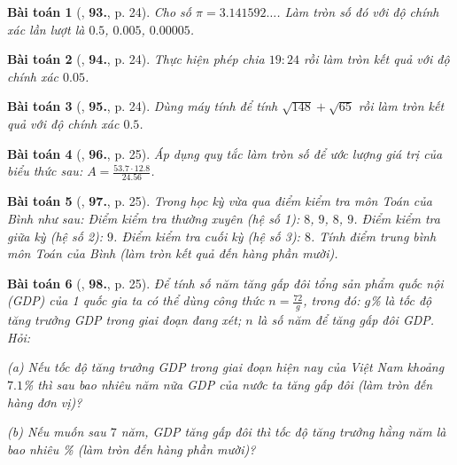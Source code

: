 \documentclass{article}
\numberwithin{equation}{section}
\newtheorem{baitoan}{Bài toán}
\begin{document}
\begin{baitoan}[\cite{Tuyen_Toan_7}, \textbf{93.}, p. 24]
	Cho số $\pi = 3.141592\ldots$. Làm tròn số đó với độ chính xác lần lượt là $0.5$, $0.005$, $0.00005$.
\end{baitoan}

\begin{baitoan}[\cite{Tuyen_Toan_7}, \textbf{94.}, p. 24]
	Thực hiện phép chia $19:24$ rồi làm tròn kết quả với độ chính xác $0.05$.
\end{baitoan}

\begin{baitoan}[\cite{Tuyen_Toan_7}, \textbf{95.}, p. 24]
	Dùng máy  tính để tính $\sqrt{148} + \sqrt{65}$ rồi làm tròn kết quả với độ chính xác $0.5$.
\end{baitoan}

\begin{baitoan}[\cite{Tuyen_Toan_7}, \textbf{96.}, p. 25]
	Áp dụng quy tắc làm tròn số để ước lượng giá trị của biểu thức sau: $A = \frac{53.7\cdot 12.8}{24.56}$.
\end{baitoan}

\begin{baitoan}[\cite{Tuyen_Toan_7}, \textbf{97.}, p. 25]
	Trong học kỳ vừa qua điểm kiểm tra môn Toán của Bình như sau: Điểm kiểm tra thường xuyên (hệ số 1): $8$, $9$, $8$, $9$. Điểm kiểm tra giữa kỳ (hệ số 2): $9$. Điểm kiểm tra cuối kỳ (hệ số 3): $8$. Tính điểm trung bình môn Toán của Bình (làm tròn kết quả đến hàng phần mười).
\end{baitoan}

\begin{baitoan}[\cite{Tuyen_Toan_7}, \textbf{98.}, p. 25]
	Để tính số năm tăng gấp đôi tổng sản phẩm quốc nội (GDP) của 1 quốc gia ta có thể dùng công thức $n = \frac{72}{g}$, trong đó: $g$\% là \emph{tốc độ tăng trưởng GDP} trong giai đoạn đang xét; $n$ là số năm để tăng gấp đôi GDP. Hỏi:
	\begin{enumerate*}
		\item[(a)] Nếu tốc độ tăng trưởng GDP trong giai đoạn hiện nay của Việt Nam khoảng $7.1$\% thì sau bao nhiêu năm nữa GDP của nước ta tăng gấp đôi (làm tròn đến hàng đơn vị)?
		\item[(b)] Nếu muốn sau $7$ năm, GDP tăng gấp đôi thì tốc độ tăng trưởng hằng năm là bao nhiêu \% (làm tròn đến hàng phần mười)?
	\end{enumerate*}
\end{baitoan}

\end{document}
